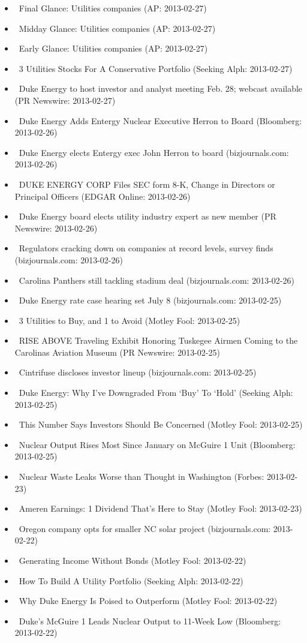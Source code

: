 \documentclass[11pt,asymmetric]{article}
\begin{document}
\begin{itemize}
\item\ Final Glance: Utilities companies (AP: 2013-02-27)
\item\ Midday Glance: Utilities companies (AP: 2013-02-27)
\item\ Early Glance: Utilities companies (AP: 2013-02-27)
\item\ 3 Utilities Stocks For A Conservative Portfolio (Seeking Alph: 2013-02-27)
\item\ Duke Energy to host investor and analyst meeting Feb. 28; webcast available (PR Newswire: 2013-02-27)
\item\ Duke Energy Adds Entergy Nuclear Executive Herron to Board (Bloomberg: 2013-02-26)
\item\ Duke Energy elects Entergy exec John Herron to board (bizjournals.com: 2013-02-26)
\item\ DUKE ENERGY CORP Files SEC form 8-K, Change in Directors or Principal Officers (EDGAR Online: 2013-02-26)
\item\ Duke Energy board elects utility industry expert as new member (PR Newswire: 2013-02-26)
\item\ Regulators cracking down on companies at record levels, survey finds (bizjournals.com: 2013-02-26)
\item\ Carolina Panthers still tackling stadium deal (bizjournals.com: 2013-02-26)
\item\ Duke Energy rate case hearing set July 8 (bizjournals.com: 2013-02-25)
\item\ 3 Utilities to Buy, and 1 to Avoid (Motley Fool: 2013-02-25)
\item\ RISE ABOVE Traveling Exhibit Honoring Tuskegee Airmen Coming to the Carolinas Aviation Museum (PR Newswire: 2013-02-25)
\item\ Cintrifuse discloses investor lineup (bizjournals.com: 2013-02-25)
\item\ Duke Energy: Why I've Downgraded From `Buy' To `Hold' (Seeking Alph: 2013-02-25)
\item\ This Number Says Investors Should Be Concerned (Motley Fool: 2013-02-25)
\item\ Nuclear Output Rises Most Since January on McGuire 1 Unit (Bloomberg: 2013-02-25)
\item\ Nuclear Waste Leaks Worse than Thought in Washington (Forbes: 2013-02-23)
\item\ Ameren Earnings: 1 Dividend That's Here to Stay (Motley Fool: 2013-02-23)
\item\ Oregon company opts for smaller NC solar project (bizjournals.com: 2013-02-22)
\item\ Generating Income Without Bonds (Motley Fool: 2013-02-22)
\item\ How To Build A Utility Portfolio (Seeking Alph: 2013-02-22)
\item\ Why Duke Energy Is Poised to Outperform (Motley Fool: 2013-02-22)
\item\ Duke’s McGuire 1 Leads Nuclear Output to 11-Week Low (Bloomberg: 2013-02-22)
\end{itemize}
\end{document}
